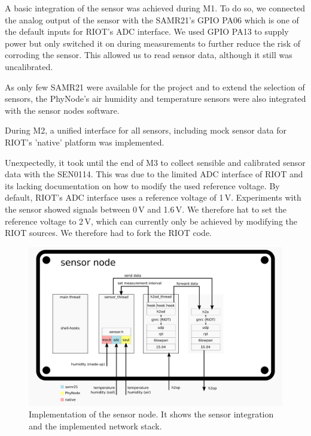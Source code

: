 \documentclass[11pt,paper=a4,parskip=half]{scrartcl}
\begin{document}
  A basic integration of the sensor was achieved during M1. To do so, we
  connected the analog output of the sensor with the SAMR21's GPIO PA06 which
  is one of the default inputs for RIOT's ADC interface. We used GPIO PA13 to
  supply power but only switched it on during measurements to further reduce
  the risk of corroding the sensor. This allowed us to read sensor data,
  although it still was uncalibrated.

  As only few SAMR21 were available for the project and to extend the selection
  of sensors, the PhyNode's air humidity and temperature sensors were also
  integrated with the sensor nodes software.

  During M2, a unified interface for all sensors, including mock sensor data
  for RIOT's 'native' platform was implemented.

  Unexpectedly, it took until the end of M3 to collect sensible and calibrated
  sensor data with the SEN0114. This was due to the limited ADC interface of
  RIOT and its lacking documentation on how to modify the used reference
  voltage. By default, RIOT's ADC interface uses a reference voltage of 1\,V.
  Experiments with the sensor showed signals between 0\,V and 1.6\,V. We therefore
  hat to set the reference voltage to 2\,V, which can currently only be achieved
  by modifying the RIOT sources. We therefore had to fork the RIOT code.



  \begin{figure}[h]
    \centering
    \includegraphics[width=\textwidth]{stack-sensor}
	  \caption{Implementation of the sensor node. It shows the sensor
	  integration and the implemented network stack.}
    \label{fig:stack_sensor}
  \end{figure}
\end{document}
